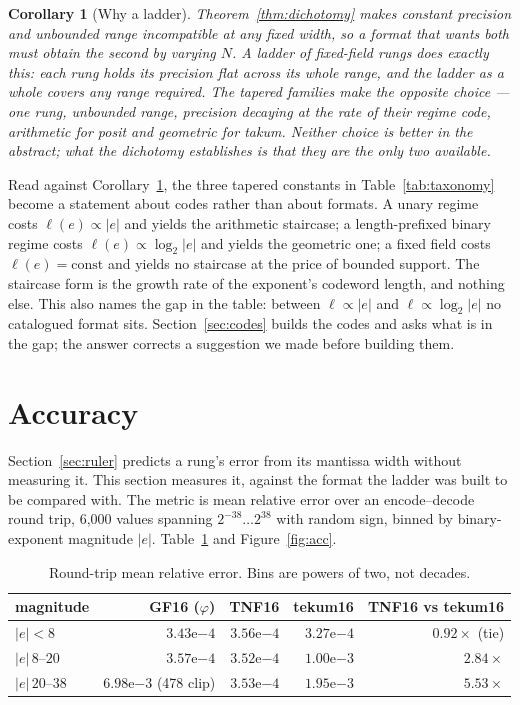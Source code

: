 \documentclass[11pt]{article}
\newtheorem{corollary}{Corollary}
\theoremstyle{definition}
\begin{document}
\begin{corollary}[Why a ladder]
\label{cor:ladder}
Theorem~\ref{thm:dichotomy} makes constant precision and unbounded range
incompatible at any fixed width, so a format that wants both must obtain the
second by varying $N$. A ladder of fixed-field rungs does exactly this: each rung
holds its precision flat across its whole range, and the ladder as a whole covers
any range required. The tapered families make the opposite choice --- one rung,
unbounded range, precision decaying at the rate of their regime code, arithmetic
for posit and geometric for takum. Neither choice is better in the abstract; what
the dichotomy establishes is that they are the only two available.
\end{corollary}

Read against Corollary~\ref{cor:ladder}, the three tapered constants in
Table~\ref{tab:taxonomy} become a statement about codes rather than about
formats. A unary regime costs $\ell(e) \propto |e|$ and yields the arithmetic
staircase; a length-prefixed binary regime costs $\ell(e) \propto \log_2 |e|$ and
yields the geometric one; a fixed field costs $\ell(e) = \mathrm{const}$ and
yields no staircase at the price of bounded support. The staircase form is the
growth rate of the exponent's codeword length, and nothing else. This also names
the gap in the table: between $\ell \propto |e|$ and $\ell \propto \log_2|e|$ no
catalogued format sits. Section~\ref{sec:codes} builds the codes and asks what is
in the gap; the answer corrects a suggestion we made before building them.

\section{Accuracy}\label{sec:accuracy}

Section~\ref{sec:ruler} predicts a rung's error from its mantissa width without
measuring it. This section measures it, against the format the ladder was built
to be compared with. The metric is mean relative error over an encode--decode
round trip, 6{,}000 values spanning
$2^{-38}\ldots2^{38}$ with random sign, binned by binary-exponent magnitude
$|e|$. Table~\ref{tab:acc} and Figure~\ref{fig:acc}.

\begin{table}[t]\centering
\caption{Round-trip mean relative error. Bins are powers of two, not decades.}
\label{tab:acc}
\begin{tabular}{lrrrr}
\toprule
magnitude & GF16 ($\varphi$) & \textbf{TNF16} & tekum16 & TNF16 vs tekum16 \\
\midrule
$|e|<8$        & $3.43\mathrm{e}{-4}$              & $3.56\mathrm{e}{-4}$ & $3.27\mathrm{e}{-4}$ & $0.92\times$ (tie) \\
$|e|\,8$--$20$   & $3.57\mathrm{e}{-4}$              & $3.52\mathrm{e}{-4}$ & $1.00\mathrm{e}{-3}$ & $\mathbf{2.84\times}$ \\
$|e|\,20$--$38$  & $6.98\mathrm{e}{-3}$ (478 clip)   & $3.53\mathrm{e}{-4}$ & $1.95\mathrm{e}{-3}$ & $\mathbf{5.53\times}$ \\
\bottomrule
\end{tabular}
\end{table}
\end{document}
